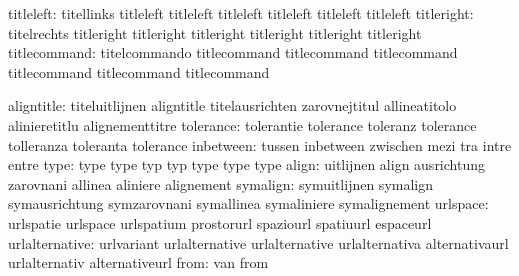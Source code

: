                 titleleft: titellinks                titleleft    %
                           titleleft                 titleleft
                           titleleft                 titleleft
                           titleleft
               titleright: titelrechts               titleright   %
                           titleright                titleright
                           titleright                titleright
                           titleright
             titlecommand: titelcommando             titlecommand %
                           titlecommand              titlecommand
                           titlecommand              titlecommand
                           titlecommand

               aligntitle: titeluitlijnen            aligntitle
                           titelausrichten           zarovnejtitul
                           allineatitolo             alinieretitlu
                           alignementtitre
                tolerance: tolerantie                tolerance
                           toleranz                  tolerance
                           tolleranza                toleranta
                           tolerance
                inbetween: tussen                    inbetween
                           zwischen                  mezi
                           tra                       intre
                           entre
                     type: type                      type
                           typ                       typ
                           type                      type
                           type
                    align: uitlijnen                 align
                           ausrichtung               zarovnani
                           allinea                   aliniere
                           alignement
                 symalign: symuitlijnen              symalign
                           symausrichtung            symzarovnani
                           symallinea                symaliniere
                           symalignement
                 urlspace: urlspatie                 urlspace
                           urlspatium                prostorurl
                           spaziourl                 spatiuurl
                           espaceurl
           urlalternative: urlvariant                urlalternative
                           urlalternative            urlalternativa
                           alternativaurl            urlalternativ
                           alternativeurl
                     from: van                       from
